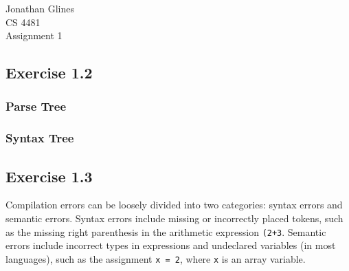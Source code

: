 \documentclass[12pt]{article}
\begin{document}
\begin{flushright}
{
\Large Jonathan Glines\\
\Large CS 4481\\
\Large Assignment 1\\
}
\end{flushright}
\subsection*{Exercise 1.2}
\subsubsection*{Parse Tree}
\subsubsection*{Syntax Tree}

\subsection*{Exercise 1.3}
Compilation errors can be loosely divided into two categories: syntax errors and semantic errors. Syntax errors include missing or incorrectly placed tokens, such as the missing right parenthesis in the arithmetic expression {\tt (2+3}. Semantic errors include incorrect types in expressions and undeclared variables (in most languages), such as the assignment {\tt x = 2}, where {\tt x} is an array variable.
\end{document}
